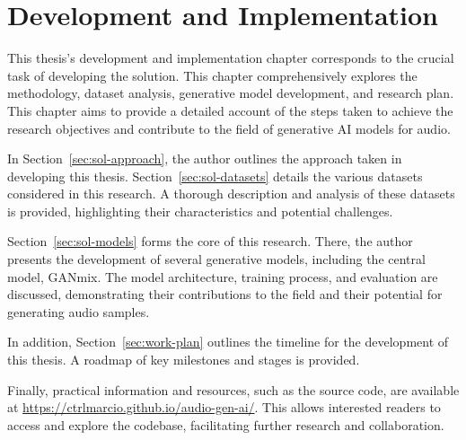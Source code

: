 \chapter{Development and Implementation} \label{chap:solution}

\minitoc

This thesis's development and implementation chapter corresponds to the crucial task of developing the solution. This chapter comprehensively explores the methodology, dataset analysis, generative model development, and research plan. This chapter aims to provide a detailed account of the steps taken to achieve the research objectives and contribute to the field of generative AI models for audio.

In Section~\ref{sec:sol-approach}, the author outlines the approach taken in developing this thesis. Section~\ref{sec:sol-datasets} details the various datasets considered in this research. A thorough description and analysis of these datasets is provided, highlighting their characteristics and potential challenges. 

Section~\ref{sec:sol-models} forms the core of this research. There, the author presents the development of several generative models, including the central model, GANmix. The model architecture, training process, and evaluation are discussed, demonstrating their contributions to the field and their potential for generating audio samples.

In addition, Section~\ref{sec:work-plan} outlines the timeline for the development of this thesis. A roadmap of key milestones and stages is provided.

Finally, practical information and resources, such as the source code, are available at \url{https://ctrlmarcio.github.io/audio-gen-ai/}. This allows interested readers to access and explore the codebase, facilitating further research and collaboration.




